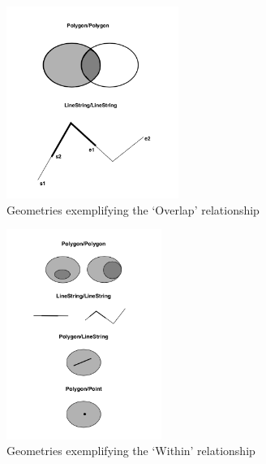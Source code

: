 \begin{figure}
    \centering

    \includegraphics[width=0.5\textwidth]{figures/overlap.png}
    
    \caption{Geometries exemplifying the `Overlap' relationship}
    \label{fig:overlap}
    
\end{figure}

\begin{figure}
    \centering

    \includegraphics[width=0.45\textwidth]{figures/within.png}
    
    \caption{Geometries exemplifying the `Within' relationship}
    \label{fig:within}
    
\end{figure}

